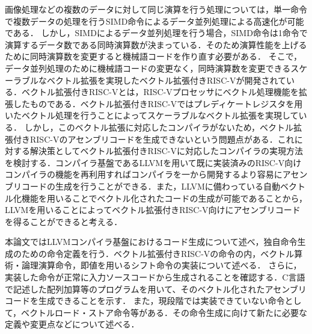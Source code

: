 画像処理などの複数のデータに対して同じ演算を行う処理については，単一命令で複数データの処理を行うSIMD命令によるデータ並列処理による高速化が可能である．
しかし，SIMDによるデータ並列処理を行う場合，SIMD命令は1命令で演算するデータ数である同時演算数が決まっている．そのため演算性能を上げるために同時演算数を変更すると機械語コードを作り直す必要がある．
そこで，データ並列処理のために機械語コードの変更なく，同時演算数を変更できるスケーラブルなベクトル拡張を実現したベクトル拡張付きRISC-Vが開発されている．ベクトル拡張付きRISC-Vとは，RISC-Vプロセッサにベクトル処理機能を拡張したものである．ベクトル拡張付きRISC-Vではプレディケートレジスタを用いたベクトル処理を行うことによってスケーラブルなベクトル拡張を実現している．
しかし，このベクトル拡張に対応したコンパイラがないため，ベクトル拡張付きRISC-Vのアセンブリコードを生成できないという問題点がある．これに対する解決策としてベクトル拡張付きRISC-Vに対応したコンパイラの実現方法を検討する．コンパイラ基盤であるLLVMを用いて既に実装済みのRISC-V向けコンパイラの機能を再利用すればコンパイラを一から開発するより容易にアセンブリコードの生成を行うことができる．また，LLVMに備わっている自動ベクトル化機能を用いることでベクトル化されたコードの生成が可能であることから，LLVMを用いることによってベクトル拡張付きRISC-V向けにアセンブリコードを得ることができると考える．

本論文ではLLVMコンパイラ基盤におけるコード生成について述べ，独自命令生成のための命令定義を行う．ベクトル拡張付きRISC-Vの命令の内，ベクトル算術・論理演算命令，即値を用いるシフト命令の実装について述べる．
さらに，実装した命令が正常に入力ソースコードから生成されることを確認する．C言語で記述した配列加算等のプログラムを用いて、そのベクトル化されたアセンブリコードを生成できることを示す．
また，現段階では実装できていない命令として，ベクトルロード・ストア命令等がある．その命令生成に向けて新たに必要な定義や変更点などについて述べる．